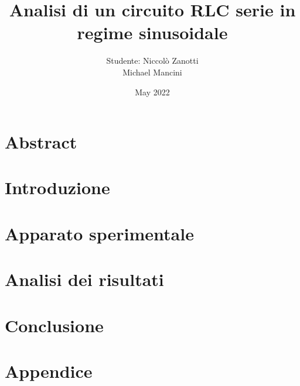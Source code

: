 \documentclass[12pt]{article}
\title{Analisi di un circuito RLC serie in regime sinusoidale}
\author{Studente: Niccolò Zanotti \\ Michael Mancini}
\date{May 2022}
\begin{document}
 \maketitle
 \hrulefill   %

 \section{Abstract}
    
 \section{Introduzione}
   
 \section{Apparato sperimentale}
   
 \section{Analisi dei risultati}
   
 \section{Conclusione}
  
 \section{Appendice}
   


 
\end{document}
